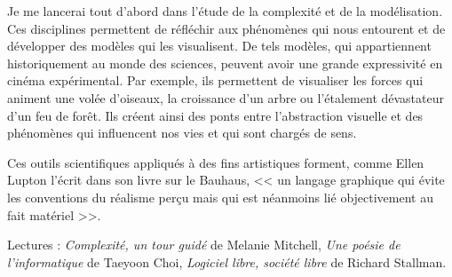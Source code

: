 \documentclass[12pt]{article}
\begin{document}
Je me lancerai tout d'abord dans l'étude de la complexité et de la modélisation. Ces disciplines permettent de réfléchir aux phénomènes qui nous entourent et de développer des modèles qui les visualisent. De tels modèles, qui appartiennent historiquement au monde des sciences, peuvent avoir une grande expressivité en cinéma expérimental. Par exemple, ils permettent de visualiser les forces qui animent une volée d'oiseaux, la croissance d'un arbre ou l'étalement dévastateur d'un feu de forêt. Ils créent ainsi des ponts entre l'abstraction visuelle et des phénomènes qui influencent nos vies et qui sont chargés de sens.

Ces outils scientifiques appliqués à des fins artistiques forment, comme \mbox{Ellen} Lupton l'écrit dans son livre sur le Bauhaus, << un langage graphique qui évite les conventions du réalisme perçu mais qui est néanmoins lié objectivement au fait matériel >>.

Lectures : \textit{Complexité, un tour guidé} de Melanie Mitchell, \textit{Une poésie de l’informatique} de Taeyoon Choi, \textit{Logiciel libre, société libre} de Richard Stallman.
\end{document}
